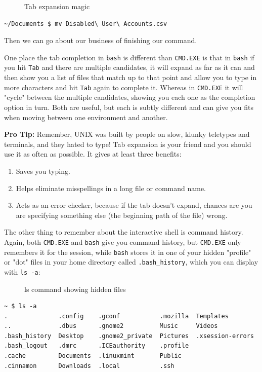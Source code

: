 \documentclass[10pt,]{book}
\numberwithin{figure}{chapter}
\DeclareRobustCommand{\drcap}[1]{\begin{figure}[H]\caption{#1}\end{figure}}
\begin{document}
\drcap{Tab expansion magic}

\begin{verbatim}
~/Documents $ mv Disabled\ User\ Accounts.csv
\end{verbatim}

Then we can go about our business of finishing our command.

One place the tab completion in \texttt{bash} is different than
\texttt{CMD.EXE} is that in \texttt{bash} if you hit \texttt{Tab} and
there are multiple candidates, it will expand as far as it can and then
show you a list of files that match up to that point and allow you to
type in more characters and hit \texttt{Tab} again to complete it.
Whereas in \texttt{CMD.EXE} it will "cycle" between the multiple
candidates, showing you each one as the completion option in turn. Both
are useful, but each is subtly different and can give you fits when
moving between one environment and another.

\textbf{Pro Tip:} Remember, UNIX was built by people on slow, klunky
teletypes and terminals, and they hated to type! Tab expansion is your
friend and you should use it as often as possible. It gives at least
three benefits:

\begin{enumerate}
\def\labelenumi{\arabic{enumi}.}
\item
  Saves you typing.
\item
  Helps eliminate misspellings in a long file or command name.
\item
  Acts as an error checker, because if the tab doesn't expand, chances
  are you are specifying something else (the beginning path of the file)
  wrong.
\end{enumerate}

The other thing to remember about the interactive shell is command
history. Again, both \texttt{CMD.EXE} and \texttt{bash} give you command
history, but \texttt{CMD.EXE} only remembers it for the session, while
\texttt{bash} stores it in one of your hidden "profile" or "dot" files
in your home directory called \texttt{.bash\_history}, which you can
display with \texttt{ls -a}:

\drcap{ls command showing hidden files}

\begin{verbatim}
~ $ ls -a
.              .config    .gconf           .mozilla  Templates
..             .dbus      .gnome2          Music     Videos
.bash_history  Desktop    .gnome2_private  Pictures  .xsession-errors
.bash_logout   .dmrc      .ICEauthority    .profile
.cache         Documents  .linuxmint       Public
.cinnamon      Downloads  .local           .ssh
\end{verbatim}
\end{document}
